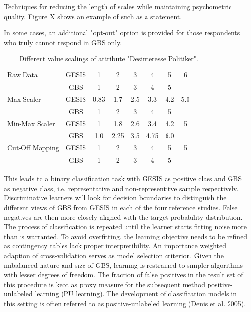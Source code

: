Techniques for reducing the length of scales while maintaining psychometric quality.
Figure X shows an example of such as a statement.


In some cases, an additional "opt-out" option is provided for those respondents who truly cannot respond in GBS only.

\begin{table}[ht]
    \begin{center}
            {\footnotesize
            \begin{tabular}{l|c|ccccccccc}
                \hline \hline
		Raw Data & GESIS & 1 & 2 & 3 & 4 & 5 & 6 \\
                     & GBS & 1 & 2 & 3 & 4 & 5 & \\
                \hline
		Max Scaler & GESIS & 0.83 & 1.7 & 2.5 & 3.3 & 4.2 & 5.0 \\
                     & GBS & 1 & 2 & 3 & 4 & 5 & \\
                \hline
		Min-Max Scaler & GESIS & 1 & 1.8 & 2.6 & 3.4 & 4.2 & 5 \\
                     & GBS & 1.0 & 2.25 & 3.5 & 4.75 & 6.0 & \\
                \hline
		Cut-Off Mapping & GESIS & 1 & 2 & 3 & 4 & 5 & 5 \\
                     & GBS & 1 & 2 & 3 & 4 & 5 & \\
            \end{tabular}}
        \caption{Different value scalings of attribute "Desinteresse Politiker".}
\label{Tab:DescripStatsRawData}
\end{center}
\end{table}

This leads to a binary classification task with GESIS as positive class and GBS as negative class, i.e. representative and non-representitve sample respectively. Discriminative learners will look for decision boundaries to distinguish the different views of GBS from GESIS in each of the four reference studies. False negatives are then more closely aligned with the target probability distribution. The process of classification is repeated until the learner starts fitting noise more than is warranted. To avoid overfitting, the learning objective needs to be refined as contingency tables lack proper interpretibility. An importance weighted adaption of cross-validation serves as model selection criterion. Given the imbalanced nature and size of GBS, learning is restrained to simpler algorithms with lesser degrees of freedom. The fraction of false positives in the result set of this procedure is kept as proxy measure for the subsequent method positive-unlabeled learning (PU learning). The development of classiﬁcation models in this setting is often referred to as positive-unlabeled learning (Denis et al. 2005).

